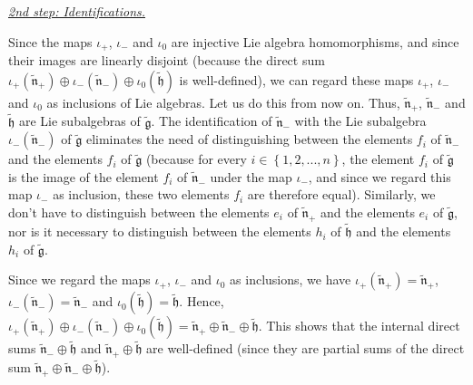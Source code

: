 \documentclass[etingof-lie.tex]{subfiles}
\begin{document}
\underline{\textit{2nd step: Identifications.}}

Since the maps $\iota_{+}$, $\iota_{-}$ and $\iota_{0}$ are injective Lie
algebra homomorphisms, and since their images are linearly disjoint (because
the direct sum $\iota_{+}\left(  \widetilde{\mathfrak{n}}_{+}\right)
\oplus\iota_{-}\left(  \widetilde{\mathfrak{n}}_{-}\right)  \oplus\iota
_{0}\left(  \widetilde{\mathfrak{h}}\right)  $ is well-defined), we can regard
these maps $\iota_{+}$, $\iota_{-}$ and $\iota_{0}$ as inclusions of Lie
algebras. Let us do this from now on. Thus, $\widetilde{\mathfrak{n}}_{+}$,
$\widetilde{\mathfrak{n}}_{-}$ and $\widetilde{\mathfrak{h}}$ are Lie
subalgebras of $\widetilde{\mathfrak{g}}$. The identification of
$\widetilde{\mathfrak{n}}_{-}$ with the Lie subalgebra $\iota_{-}\left(
\widetilde{\mathfrak{n}}_{-}\right)  $ of $\widetilde{\mathfrak{g}}$
eliminates the need of distinguishing between the elements $f_{i}$ of
$\widetilde{\mathfrak{n}}_{-}$ and the elements $f_{i}$ of
$\widetilde{\mathfrak{g}}$ (because for every $i\in\left\{  1,2,...,n\right\}
$, the element $f_{i}$ of $\widetilde{\mathfrak{g}}$ is the image of the
element $f_{i}$ of $\widetilde{\mathfrak{n}}_{-}$ under the map $\iota_{-}$,
and since we regard this map $\iota_{-}$ as inclusion, these two elements
$f_{i}$ are therefore equal). Similarly, we don't have to distinguish between
the elements $e_{i}$ of $\widetilde{\mathfrak{n}}_{+}$ and the elements
$e_{i}$ of $\widetilde{\mathfrak{g}}$, nor is it necessary to distinguish
between the elements $h_{i}$ of $\widetilde{\mathfrak{h}}$ and the elements
$h_{i}$ of $\widetilde{\mathfrak{g}}$.

Since we regard the maps $\iota_{+}$, $\iota_{-}$ and $\iota_{0}$ as
inclusions, we have $\iota_{+}\left(  \widetilde{\mathfrak{n}}_{+}\right)
=\widetilde{\mathfrak{n}}_{+}$, $\iota_{-}\left(  \widetilde{\mathfrak{n}}%
_{-}\right)  =\widetilde{\mathfrak{n}}_{-}$ and $\iota_{0}\left(
\widetilde{\mathfrak{h}}\right)  =\widetilde{\mathfrak{h}}$. Hence, $\iota
_{+}\left(  \widetilde{\mathfrak{n}}_{+}\right)  \oplus\iota_{-}\left(
\widetilde{\mathfrak{n}}_{-}\right)  \oplus\iota_{0}\left(
\widetilde{\mathfrak{h}}\right)  =\widetilde{\mathfrak{n}}_{+}\oplus
\widetilde{\mathfrak{n}}_{-}\oplus\widetilde{\mathfrak{h}}$. This shows that
the internal direct sums $\widetilde{\mathfrak{n}}_{-}\oplus
\widetilde{\mathfrak{h}}$ and $\widetilde{\mathfrak{n}}_{+}\oplus
\widetilde{\mathfrak{h}}$ are well-defined (since they are partial sums of the
direct sum $\widetilde{\mathfrak{n}}_{+}\oplus\widetilde{\mathfrak{n}}%
_{-}\oplus\widetilde{\mathfrak{h}}$).
\end{document}
